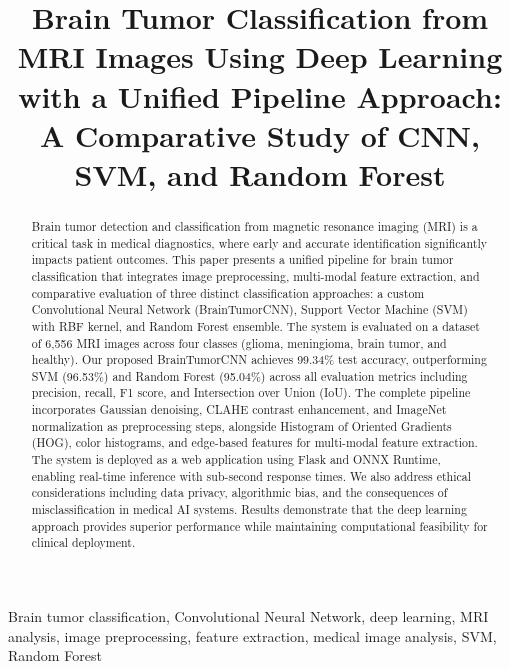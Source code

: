 \documentclass[conference]{IEEEtran}
\begin{document}
\title{Brain Tumor Classification from MRI Images Using Deep Learning with a Unified Pipeline Approach:\\A Comparative Study of CNN, SVM, and Random Forest}

\author{
}

\maketitle

\begin{abstract}
Brain tumor detection and classification from magnetic resonance imaging (MRI) is a critical task in medical diagnostics, where early and accurate identification significantly impacts patient outcomes. This paper presents a unified pipeline for brain tumor classification that integrates image preprocessing, multi-modal feature extraction, and comparative evaluation of three distinct classification approaches: a custom Convolutional Neural Network (BrainTumorCNN), Support Vector Machine (SVM) with RBF kernel, and Random Forest ensemble. The system is evaluated on a dataset of 6,556 MRI images across four classes (glioma, meningioma, brain tumor, and healthy). Our proposed BrainTumorCNN achieves 99.34\% test accuracy, outperforming SVM (96.53\%) and Random Forest (95.04\%) across all evaluation metrics including precision, recall, F1 score, and Intersection over Union (IoU). The complete pipeline incorporates Gaussian denoising, CLAHE contrast enhancement, and ImageNet normalization as preprocessing steps, alongside Histogram of Oriented Gradients (HOG), color histograms, and edge-based features for multi-modal feature extraction. The system is deployed as a web application using Flask and ONNX Runtime, enabling real-time inference with sub-second response times. We also address ethical considerations including data privacy, algorithmic bias, and the consequences of misclassification in medical AI systems. Results demonstrate that the deep learning approach provides superior performance while maintaining computational feasibility for clinical deployment.
\end{abstract}

\begin{IEEEkeywords}
Brain tumor classification, Convolutional Neural Network, deep learning, MRI analysis, image preprocessing, feature extraction, medical image analysis, SVM, Random Forest
\end{IEEEkeywords}
\end{document}
